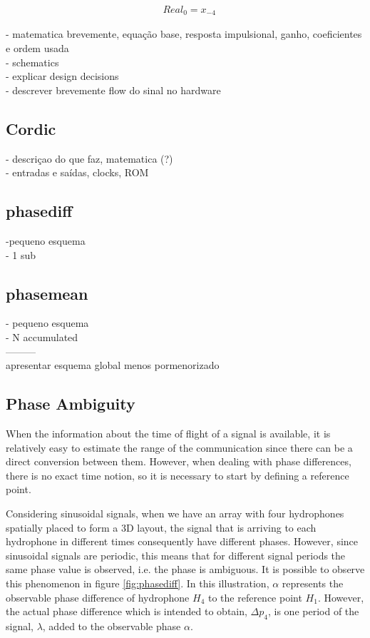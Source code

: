 \begin{eqnarray}
&Real_0 = x_{-4} 
\label{eq:hilbert_reeq}
\end{eqnarray}

- matematica brevemente, equação base, resposta impulsional, ganho, coeficientes e ordem usada
\\
- schematics 
\\
- explicar design decisions
\\
- descrever brevemente flow do sinal no hardware

\subsection{Cordic}
- descriçao do que faz, matematica (?)
\\
- entradas e saídas, clocks, ROM

\subsection{phasediff}
-pequeno esquema 
\\
- 1 sub

\subsection{phasemean}
- pequeno esquema
\\
- N accumulated
\\
---------
\\
apresentar esquema global menos pormenorizado


\subsection{Phase Ambiguity}

When the information about the time of flight of a signal is available, it is relatively easy to estimate the range of the communication since there can be a direct conversion between them. However, when dealing with phase differences, there is no exact time notion, so it is necessary to start by defining a reference point. 

Considering sinusoidal signals, when we have an array with four hydrophones spatially placed to form a 3D layout, the signal that is arriving to each  hydrophone in different times consequently have different phases. However, since sinusoidal signals are periodic, this means that for different signal periods the same phase value is observed, i.e. the phase is ambiguous. It is possible to observe this phenomenon in figure \ref{fig:phasediff}. In this illustration, $\alpha$ represents the observable phase difference of hydrophone $H_4$ to the reference point $H_1$. However, the actual phase difference which is intended to obtain, $\Delta p_4$, is one period of the signal, $\lambda$, added to the observable phase $\alpha$.

